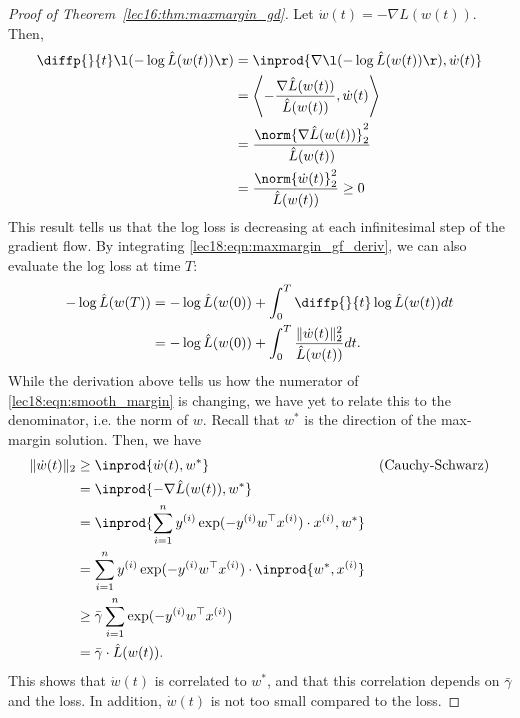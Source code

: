 \begin{proof}[Proof of Theorem~\ref{lec16:thm:maxmargin_gd}]
Let $\dot{w}(t)= -\nabla \hat L(w(t))$. Then,
\begin{align}
    \diffp{}{t} \l (-\log \hat{L}(w(t)) \r ) &= \inprod{\nabla\l ( -\log  \hat{L}(w(t)) \r ),\dot{w}(t)} \\
    &=\left \langle -\frac{\nabla\hat{L}(w(t))}{\hat{L}(w(t))},\dot{w}(t) \right \rangle \\
    &=\frac{\norm{\nabla\hat{L}(w(t))}_2^2}{\hat{L}(w(t))} \\
    &=\frac{\norm{\dot{w}(t)}_2^2}{\hat{L}(w(t))} \geq 0 \label{lec18:eqn:maxmargin_gf_deriv}
\end{align}
This result tells us that the log loss is decreasing at each infinitesimal step of the gradient flow. By integrating \eqref{lec18:eqn:maxmargin_gf_deriv}, we can also evaluate the log loss at time $T$:
\begin{align}
    -\log\hat{L} (w(T) ) &= -\log\hat{L}(w(0)) + \int_0^T \diffp{}{t}\log\hat{L}(w(t)) dt \label{lec18:eqn:gf_wt_expansion} \\
    &= -\log \hat{L}(w(0)) + \int_0^T \frac{\|\dot{w}(t)\|_2^2}{\hat{L}(w(t))} dt.
\end{align}
While the derivation above tells us how the numerator of \eqref{lec18:eqn:smooth_margin} is changing, we have yet to relate this to the denominator, i.e. the norm of $w$. Recall that $w^*$ is the direction of the max-margin solution. Then, we have
\begin{align}
    \|\dot{w}(t)\|_2 &\geq \inprod{\dot{w}(t), w^*} &\text{(Cauchy-Schwarz)} \label{lec18:eqn:cs-dotw} \\
    & = \inprod{-\nabla \hat L(w(t)), w^*} \\
    &= \inprod{ \sum_{i=1}^n y^{(i)}\exp(-y^{(i)}w^\top x^{(i)})\cdot x^{(i)}, w^* } \\
    &= \sum_{i=1}^n y^{(i)}\exp(-y^{(i)}w^\top x^{(i)})\cdot \inprod{w^*,  x^{(i)}} \\
    &\geq \bar{\gamma}\sum_{i=1}^n \exp(-y^{(i)}w^\top x^{(i)}) \\
    &=\bar{\gamma} \cdot \hat{L}(w(t)).
\end{align}
This shows that $\dot{w}(t)$ is correlated to $w^*$, and that this correlation depends on $\bar{\gamma}$ and the loss. In addition, $\dot{w}(t)$ is not too small compared to the loss.


\end{proof}
